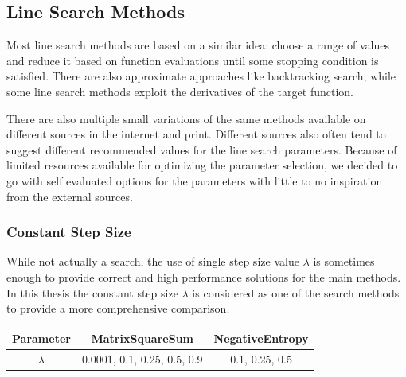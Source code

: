 \documentclass[a4paper,english,titlepage,12pt]{article}
\newcommand{\todoinline}{\todo[inline,color=green!40]}
\begin{document}
\todoinline{Add HBM parameters table}


\subsection{Line Search Methods}
\label{sect:line_search_methods}

Most line search methods are based on a similar idea: choose a range of values and reduce it based on function evaluations until some stopping condition is satisfied. There are also approximate approaches like backtracking search, while some line search methods exploit the derivatives of the target function.

There are also multiple small variations of the same methods available on different sources in the internet and print. Different sources also often tend to suggest different recommended values for the line search parameters. Because of limited resources available for optimizing the parameter selection, we decided to go with self evaluated options for the parameters with little to no inspiration from the external sources. \cite{book:convex_optimization} \cite{book:nonlinear_programming} 


\subsubsection{Constant Step Size}


While not actually a search, the use of single step size value $\lambda$ is sometimes enough to provide correct and high performance solutions for the main methods. In this thesis the constant step size $\lambda$ is considered as one of the search methods to provide a more comprehensive comparison.

\begin{table}[H]
\label{tab:params_ConstantSearch}
\centering
{}
\begin{tabular}{|c|c|c|}
\hline
\rowcolor{gray!25}
Parameter & MatrixSquareSum & NegativeEntropy \\
\hline
$\lambda$ & 0.0001, 0.1, 0.25, 0.5, 0.9 & 0.1, 0.25, 0.5 \\
\hline
\end{tabular}
\end{table}
\end{document}
